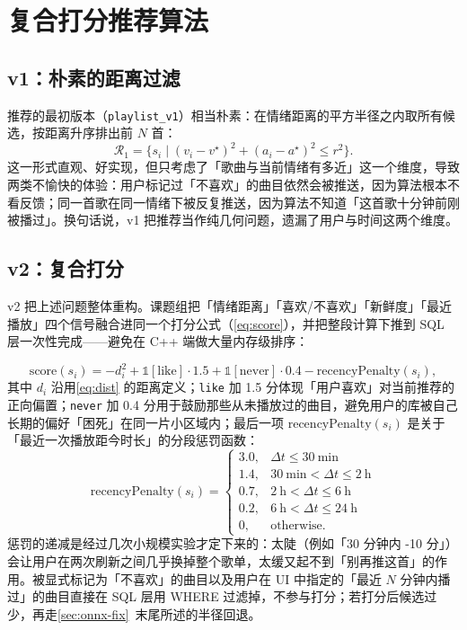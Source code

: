 \section{复合打分推荐算法}\label{sec:reco}

\subsection{v1：朴素的距离过滤}

推荐的最初版本（\texttt{playlist\_v1}）相当朴素：在情绪距离的平方半径之内取所有候选，按距离升序排出前 $N$ 首：
\begin{equation}
  \mathcal{R}_1 = \bigl\{ s_i \mid (v_i - v^\star)^2 + (a_i - a^\star)^2 \leq r^2 \bigr\}.
\end{equation}
这一形式直观、好实现，但只考虑了「歌曲与当前情绪有多近」这一个维度，导致两类不愉快的体验：用户标记过「不喜欢」的曲目依然会被推送，因为算法根本不看反馈；同一首歌在同一情绪下被反复推送，因为算法不知道「这首歌十分钟前刚被播过」。换句话说，v1 把推荐当作纯几何问题，遗漏了用户与时间这两个维度。

\subsection{v2：复合打分}

v2 把上述问题整体重构。课题组把「情绪距离」「喜欢/不喜欢」「新鲜度」「最近播放」四个信号融合进同一个打分公式（\cref{eq:score}），并把整段计算下推到 SQL 层一次性完成——避免在 C++ 端做大量内存级排序：

\begin{equation}\label{eq:score}
  \mathrm{score}(s_i) = -d_i^2 + \mathbb{1}[\text{like}] \cdot 1.5 + \mathbb{1}[\text{never}] \cdot 0.4 - \mathrm{recencyPenalty}(s_i),
\end{equation}
其中 $d_i$ 沿用\cref{eq:dist} 的距离定义；\texttt{like} 加 1.5 分体现「用户喜欢」对当前推荐的正向偏置；\texttt{never} 加 0.4 分用于鼓励那些从未播放过的曲目，避免用户的库被自己长期的偏好「困死」在同一片小区域内；最后一项 $\mathrm{recencyPenalty}(s_i)$ 是关于「最近一次播放距今时长」的分段惩罚函数：
\begin{equation}\label{eq:recency}
  \mathrm{recencyPenalty}(s_i) = \begin{cases}
    3.0, & \Delta t \leq 30\ \text{min} \\
    1.4, & 30\ \text{min} < \Delta t \leq 2\ \text{h} \\
    0.7, & 2\ \text{h}  < \Delta t \leq 6\ \text{h} \\
    0.2, & 6\ \text{h}  < \Delta t \leq 24\ \text{h} \\
    0,   & \text{otherwise}.
  \end{cases}
\end{equation}
惩罚的递减是经过几次小规模实验才定下来的：太陡（例如「30 分钟内 -10 分」）会让用户在两次刷新之间几乎换掉整个歌单，太缓又起不到「别再推这首」的作用。被显式标记为「不喜欢」的曲目以及用户在 UI 中指定的「最近 $N$ 分钟内播过」的曲目直接在 SQL 层用 WHERE 过滤掉，不参与打分；若打分后候选过少，再走\cref{sec:onnx-fix}~末尾所述的半径回退。


